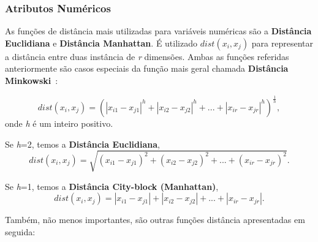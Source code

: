\subsubsection{Atributos Numéricos} \label{subsubsec: attrnum}

As funções de distância mais utilizadas para variáveis numéricas são a \textbf{Distância Euclidiana} e \textbf{Distância Manhattan}. É utilizado $ dist(x_{i}, x_{j}) $ para representar a distância entre duas instância de \textit{r} dimensões. Ambas as funções referidas anteriormente são casos especiais da função mais geral chamada \textbf{Distância Minkowski}~\citet{Liu2011}:

\begin{equation}
dist(x_{i}, x_{j}) = (|x_{i1} - x_{j1}|^h + |x_{i2} - x_{j2}|^h +...+ |x_{ir} - x_{jr}|^h)^\frac{1}{h},
\label{eq:mink}
\end{equation}
onde \textit{h} é um inteiro positivo.

Se \textit{h}=2, temos a \textbf{Distância Euclidiana},
\begin{equation} 
dist(x_{i}, x_{j}) = \sqrt{(x_{i1} - x_{j1})^2 + (x_{i2} - x_{j2})^2 +...+ (x_{ir} - x_{jr})^2}.
\label{eq: euclid}
\end{equation}

Se \textit{h}=1, temos a \textbf{Distância City-block (Manhattan)},
\begin{equation}
dist(x_{i}, x_{j}) = |x_{i1} - x_{j1}| + |x_{i2} - x_{j2}| +...+ |x_{ir} - x_{jr}|.
\label{eq: manhattan}
\end{equation}

Também, não menos importantes, são outras funções distância apresentadas em seguida:

